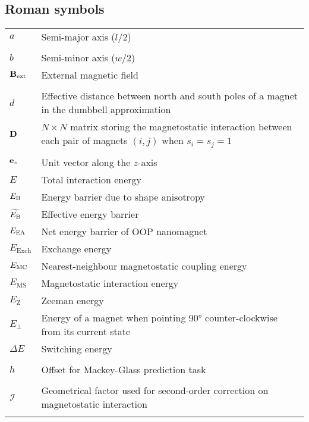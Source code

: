 \subsection*{Roman symbols}
\begin{longtable}[l]{p{60pt} p{350pt}}
	$a$ & Semi-major axis ($l/2$) \\ %
	&\\

	$b$ & Semi-minor axis ($w/2$) \\
	$\boldsymbol{\mathbf{B}}_\mathrm{ext}$ & External magnetic field \\
	&\\

	$d$ & Effective distance between north and south poles of a magnet in the dumbbell approximation \\
	$\boldsymbol{\mathbf{D}}$ & $N \times N$ matrix storing the magnetostatic interaction between each pair of magnets $(i,j)$ when $s_i=s_j=1$ \\
	&\\

	$\boldsymbol{\mathbf{e}}_z$ & Unit vector along the $z$-axis \\
	$E$ & Total interaction energy \\
	$E_\mathrm{B}$ & Energy barrier due to shape anisotropy \\ %
	$\widetilde{E_\mathrm{B}}$ & Effective energy barrier \\
	$E_\mathrm{EA}$ & Net energy barrier of OOP nanomagnet \\
	$E_\mathrm{Exch}$ & Exchange energy\\
	$E_\mathrm{MC}$ & Nearest-neighbour magnetostatic coupling energy \\
	$E_\mathrm{MS}$ & Magnetostatic interaction energy \\
	$E_\mathrm{Z}$ & Zeeman energy\\
	$E_\perp$ & Energy of a magnet when pointing \ang{90} counter-clockwise from its current state \\
	$\Delta E$ & Switching energy \\
	&\\

	$h$ & Offset for Mackey-Glass prediction task \\
	&\\

	$\mathcal{I}$ & Geometrical factor used for second-order correction on magnetostatic interaction \\
	&\\


\end{longtable}
